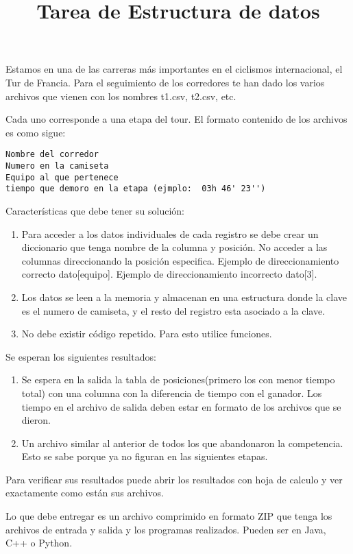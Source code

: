 \documentclass[12pt,letterpaper]{article}
\title{Tarea de Estructura de datos}
\begin{document}
\maketitle
Estamos en una de las carreras más importantes en el ciclismos internacional, el Tur de Francia. Para el seguimiento de los corredores te han dado los varios archivos que vienen con los nombres t1.csv, t2.csv, etc.

Cada uno corresponde a una etapa del tour.  El formato contenido de los archivos es como sigue:
\begin{verbatim}
Nombre del corredor
Numero en la camiseta
Equipo al que pertenece
tiempo que demoro en la etapa (ejmplo: 	03h 46' 23'')
\end{verbatim}

Características que debe tener su  solución:

\begin{enumerate}
\item Para acceder a los datos individuales de cada registro se debe crear un diccionario que tenga nombre de la columna y posición. No acceder a las columnas direccionando la posición especifica. Ejemplo de direccionamiento correcto dato[equipo]. Ejemplo de direccionamiento incorrecto dato[3].
\item Los datos se leen a la memoria y almacenan en una estructura donde la clave es el numero de camiseta, y el resto del registro esta asociado a la clave.
\item No debe existir código repetido. Para esto utilice funciones.
\end{enumerate}

Se esperan los siguientes resultados:

\begin{enumerate}
\item Se espera en la salida la tabla de posiciones(primero los con menor tiempo total) con una columna con la diferencia de tiempo con el ganador. Los tiempo en el archivo de salida deben estar en formato de los archivos que se dieron.
\item Un archivo similar al anterior de todos los que abandonaron la competencia. Esto se sabe porque ya no figuran en las siguientes etapas.
\end{enumerate}

Para verificar sus resultados puede abrir los resultados con hoja de calculo y ver exactamente como están sus archivos.

Lo que debe entregar es un archivo comprimido en formato ZIP que tenga los archivos de entrada y salida y los programas realizados. Pueden ser en Java, C++ o Python.
\end{document}
